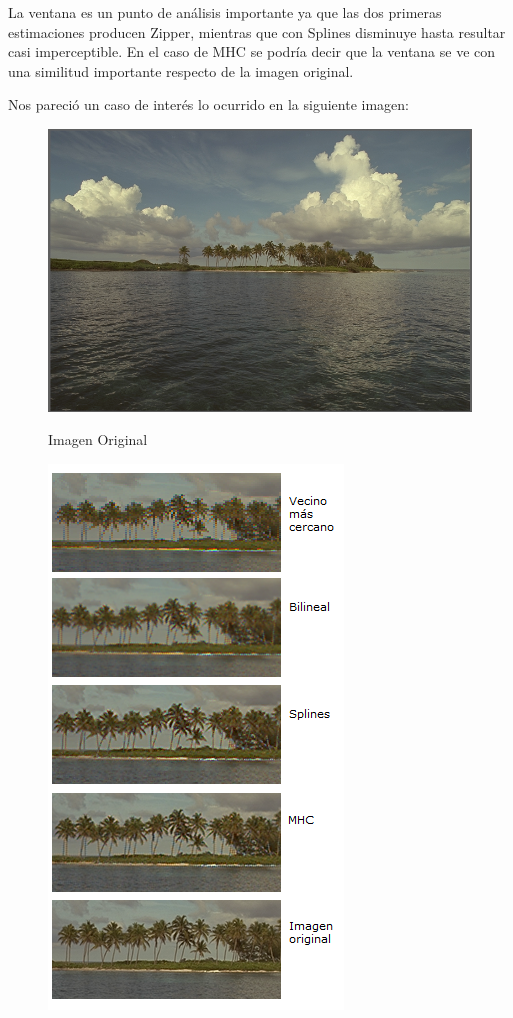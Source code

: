 \documentclass[a4paper]{article}
\begin{document}
La ventana es un punto de an\'alisis importante ya que las dos primeras estimaciones producen Zipper, mientras que con Splines disminuye hasta resultar casi imperceptible. En el caso de MHC se podr\'ia decir que la ventana se ve con una similitud importante respecto de la imagen original.

\newpage

Nos pareci\'o un caso de inter\'es lo ocurrido en la siguiente imagen:
\begin{figure}[h!]
    \caption{Imagen Original}
    \begin{center}
    \includegraphics[scale=0.15]{imagenes/comparacion/07/img7}
    \label{imgOri2}
  \end{center}
\end{figure}

\begin{figure}[h!]
    \caption{}
    \begin{center}
    \includegraphics[scale=1]{imagenes/comparacion/07/palmeritas}
    \label{palmas}
  \end{center}
\end{figure}
\end{document}
